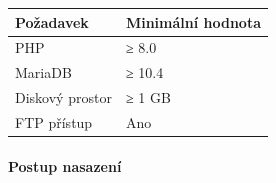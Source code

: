 {\def\LTcaptype{none} %
\begin{longtable}[]{@{}ll@{}}
\toprule\noalign{}
Požadavek & Minimální hodnota \\
\midrule\noalign{}
\endhead
\bottomrule\noalign{}
\endlastfoot
PHP & ≥ 8.0 \\
MariaDB & ≥ 10.4 \\
Diskový prostor & ≥ 1 GB \\
FTP přístup & Ano \\
\end{longtable}
}

\paragraph{Postup nasazení}\label{postup-nasazenuxed}

